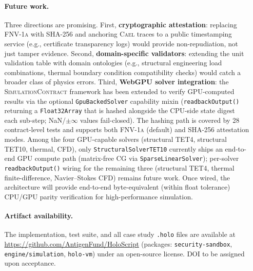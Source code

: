 \documentclass[letterpaper,twocolumn,10pt]{article}
\providecommand{\measuredFrom}[1]{}
\newcommand{\cael}{\textsc{Cael}}
\newcommand{\simcontract}{\textsc{SimulationContract}}
\newcommand{\fnvhash}{\textsc{FNV-1a}}
\begin{document}
\paragraph{Future work.}
Three directions are promising. First, \textbf{cryptographic
attestation}: replacing \fnvhash{} with SHA-256 and anchoring
\cael{} traces to a public timestamping service (e.g., certificate
transparency logs) would provide non-repudiation, not just tamper
evidence. Second, \textbf{domain-specific validators}: extending
the unit validation table with domain ontologies (e.g., structural
engineering load combinations, thermal boundary condition
compatibility checks) would catch a broader class of physics errors.
Third, \textbf{WebGPU solver integration}:
\measuredFrom{HoloScript/packages/engine/src/simulation/SimulationContract.ts}%
\measuredFrom{HoloScript/packages/engine/src/simulation/SimSolver.ts}%
\measuredFrom{HoloScript/packages/engine/src/simulation/__tests__/SimulationContractWebGpu.test.ts}%
\measuredFrom{HoloScript/packages/engine/src/simulation/StructuralSolverTET10.ts}%
the \simcontract{} framework has been extended to verify GPU-computed
results via the optional \texttt{GpuBackedSolver} capability mixin
(\texttt{readbackOutput()} returning a \texttt{Float32Array} that
is hashed alongside the CPU-side state digest each sub-step;
NaN/$\pm\infty$ values fail-closed). The hashing path is covered
by 28 contract-level tests and supports both \fnvhash{} (default) and
SHA-256 attestation modes. Among the four GPU-capable solvers
(structural TET4, structural TET10, thermal, CFD), only
\texttt{StructuralSolverTET10} currently ships an end-to-end
GPU compute path (matrix-free CG via \texttt{SparseLinearSolver});
per-solver \texttt{readbackOutput()} wiring for the remaining
three (structural TET4, thermal finite-difference, Navier--Stokes
CFD) remains future work. Once wired, the architecture will
provide end-to-end byte-equivalent (within float tolerance)
CPU/GPU parity verification for high-performance simulation.

\paragraph{Artifact availability.}
The implementation, test suite, and all case study \texttt{.holo} files
are available at \url{https://github.com/AntigenFund/HoloScript}
(packages: \texttt{security-sandbox}, \texttt{engine/simulation},
\texttt{holo-vm}) under an open-source license. DOI to be assigned
upon acceptance.

\end{document}

